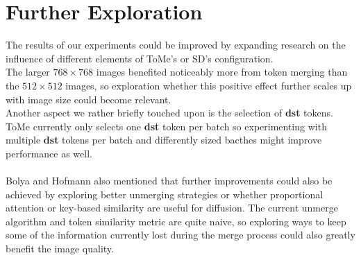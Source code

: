 \section{Further Exploration}
The results of our experiments could be improved by expanding research on the influence of different elements of ToMe's or SD's configuration.\\ 
The larger $768 \times 768$ images benefited noticeably more from token merging than the $512 \times 512$ images, so exploration whether this positive effect further scales up with image size could become relevant.\\
Another aspect we rather briefly touched upon is the selection of \textbf{dst} tokens. ToMe currently only selects one \textbf{dst} token per batch so experimenting with multiple \textbf{dst} tokens per batch and differently sized bacthes might improve performance as well.\\ 
\\
Bolya and Hofmann also mentioned that further improvements could also be achieved by exploring better unmerging strategies or whether proportional attention or key-based similarity are useful for diffusion.
The current unmerge algorithm and token similarity metric are quite naive, so exploring ways to keep some of the information currently lost during the merge process could also greatly benefit the image quality.



